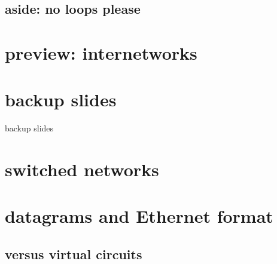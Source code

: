 \subsection{aside: no loops please}



\section{preview: internetworks}





\section{backup slides}
\begin{frame}{backup slides}
\end{frame}

\section{switched networks}



\section{datagrams and Ethernet format}




\subsection{versus virtual circuits}



